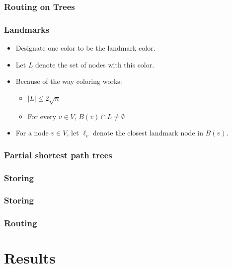 \documentclass[10pt, compress]{beamer}
\begin{document}
\begin{frame}[fragile]
  \frametitle{Routing on Trees}


\end{frame}

\begin{frame}[fragile]
  \frametitle{Landmarks}
  \begin{itemize}
    \item Designate one color to be the landmark color.
    \item Let $L$ denote the set of nodes with this color.
    \item Because of the way coloring works:
    \begin{itemize}
        \item $|L| \leq 2 \sqrt{n}$
        \item For every $v\in V$, $B(v)\cap L \neq \emptyset$
    \end{itemize}
    \item For a node $v\in V$, let $\ell_v$ denote the closest landmark node in $B(v)$.
  \end{itemize}

\end{frame}

\begin{frame}[fragile]
  \frametitle{Partial shortest path trees}


\end{frame}

\begin{frame}[fragile]
  \frametitle{Storing}


\end{frame}

\begin{frame}[fragile]
  \frametitle{Storing}


\end{frame}

\begin{frame}[fragile]
  \frametitle{Routing}


\end{frame}


\section{Results}
\end{document}
